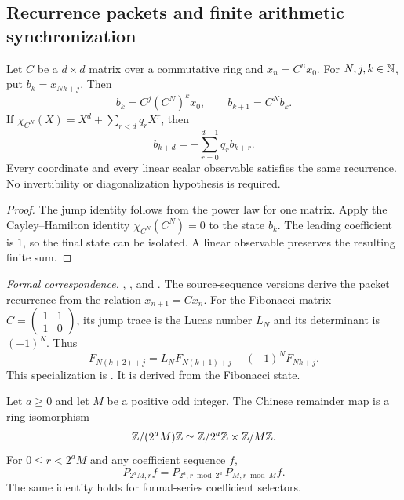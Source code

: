 \subsection{Recurrence packets and finite arithmetic synchronization}

\begin{theorem}
\label{thm:companion-foundation}
Let $C$ be a $d\times d$ matrix over a commutative ring and
$x_n=C^n x_0$. For $N,j,k\in\mathbb N$, put $b_k=x_{Nk+j}$. Then
\[
b_k=C^j(C^N)^kx_0,\qquad b_{k+1}=C^Nb_k.
\]
If $\chi_{C^N}(X)=X^d+\sum_{r<d}q_rX^r$, then
\[
b_{k+d}=-\sum_{r=0}^{d-1}q_r b_{k+r}.
\]
Every coordinate and every linear scalar observable satisfies the same
recurrence. No invertibility or diagonalization hypothesis is required.
\end{theorem}

\begin{proof}
The jump identity follows from the power law for one matrix. Apply the
Cayley--Hamilton identity $\chi_{C^N}(C^N)=0$ to the state $b_k$.
The leading coefficient is $1$, so the final state can be isolated. A linear
observable preserves the resulting finite sum.
\end{proof}

\begingroup\small\raggedright
\noindent\emph{Formal correspondence.}
,
, and
.
The source-sequence versions derive the packet recurrence from the relation
$x_{n+1}=Cx_n$.
For the Fibonacci matrix $C=\left(\begin{smallmatrix}1&1\\1&0\end{smallmatrix}\right)$,
its jump trace is the Lucas number $L_N$ and its determinant is $(-1)^N$.
Thus
\[
F_{N(k+2)+j}=L_NF_{N(k+1)+j}-(-1)^NF_{Nk+j}.
\]
This specialization is
. It is derived from the
Fibonacci state.
\par\endgroup

\begin{theorem}
\label{thm:crt-foundation}
Let $a\geq0$ and let $M$ be a positive odd integer. The Chinese remainder map
is a ring isomorphism
\[
\mathbb Z/(2^aM)\mathbb Z\simeq\mathbb Z/2^a\mathbb Z\times\mathbb Z/M\mathbb Z.
\]
For $0\leq r<2^aM$ and any coefficient sequence $f$,
\[
P_{2^aM,r}f
=P_{2^a,r\bmod 2^a}\,P_{M,r\bmod M}f.
\]
The same identity holds for formal-series coefficient selectors.
\end{theorem}

